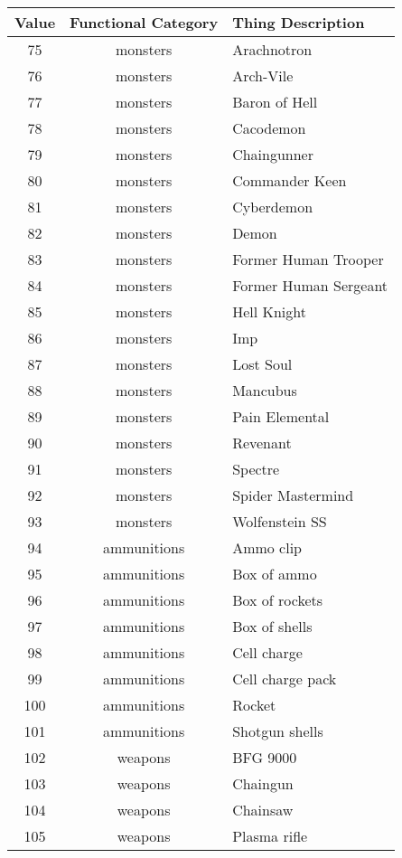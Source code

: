 \begin{table}[b]
\centering
\begin{tabularx}{\textwidth}{| c | c | X | }
\hline
\textbf{Value} & \textbf{Functional Category} & \textbf{Thing Description} \\
\hline
		
		75	& monsters	& Arachnotron \\
		76	& monsters	& Arch-Vile \\
		77	& monsters	& Baron of Hell \\
		78	& monsters	& Cacodemon \\
		79	& monsters	& Chaingunner \\
		80	& monsters	& Commander Keen \\
		81	& monsters	& Cyberdemon \\
		82	& monsters	& Demon \\
		83	& monsters	& Former Human Trooper \\
		84	& monsters	& Former Human Sergeant \\
		85	& monsters	& Hell Knight \\
		86	& monsters	& Imp \\
		87	& monsters	& Lost Soul \\
		88	& monsters	& Mancubus \\
		89	& monsters	& Pain Elemental \\
		90	& monsters	& Revenant \\
		91	& monsters	& Spectre \\
		92	& monsters	& Spider Mastermind \\
		93	& monsters	& Wolfenstein SS \\
		94	& ammunitions	& Ammo clip \\
		95	& ammunitions	& Box of ammo \\
		96	& ammunitions	& Box of rockets \\
		97	& ammunitions	& Box of shells \\
		98	& ammunitions	& Cell charge \\
		99	& ammunitions	& Cell charge pack \\
		100	& ammunitions	& Rocket \\
		101	& ammunitions	& Shotgun shells \\
		102	& weapons	& BFG 9000 \\
		103	& weapons	& Chaingun \\
		104	& weapons	& Chainsaw \\
		105	& weapons	& Plasma rifle \\

\end{tabularx}
\end{table}
